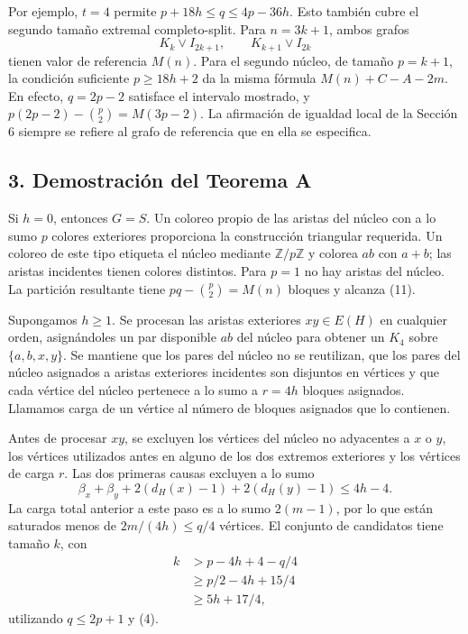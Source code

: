 \documentclass[spanish,11pt,a4paper]{article}
\begin{document}
Por ejemplo, \(t=4\) permite \(p+18h\le q\le4p-36h\). Esto también cubre
el segundo tamaño extremal completo-split. Para \(n=3k+1\), ambos grafos
\[
K_k\vee I_{2k+1},\qquad K_{k+1}\vee I_{2k}
\] tienen valor de referencia \(M(n)\). Para el segundo núcleo, de
tamaño \(p=k+1\), la condición suficiente \(p\ge18h+2\) da la misma
fórmula \(M(n)+C-A-2m\). En efecto, \(q=2p-2\) satisface el intervalo
mostrado, y \(p(2p-2)-\binom p2=M(3p-2)\). La afirmación de igualdad
local de la Sección 6 siempre se refiere al grafo de referencia que en
ella se especifica.

\subsection{3. Demostración del Teorema
A}\label{demostraciuxf3n-del-teorema-a}

Si \(h=0\), entonces \(G=S\). Un coloreo propio de las aristas del
núcleo con a lo sumo \(p\) colores exteriores proporciona la
construcción triangular requerida. Un coloreo de este tipo etiqueta el
núcleo mediante \(\mathbb Z/p\mathbb Z\) y colorea \(ab\) con \(a+b\);
las aristas incidentes tienen colores distintos. Para \(p=1\) no hay
aristas del núcleo. La partición resultante tiene \(pq-\binom p2=M(n)\)
bloques y alcanza (11).

Supongamos \(h\ge1\). Se procesan las aristas exteriores \(xy\in E(H)\)
en cualquier orden, asignándoles un par disponible \(ab\) del núcleo
para obtener un \(K_4\) sobre \(\{a,b,x,y\}\). Se mantiene que los pares
del núcleo no se reutilizan, que los pares del núcleo asignados a
aristas exteriores incidentes son disjuntos en vértices y que cada
vértice del núcleo pertenece a lo sumo a \(r=4h\) bloques asignados.
Llamamos carga de un vértice al número de bloques asignados que lo
contienen.

Antes de procesar \(xy\), se excluyen los vértices del núcleo no
adyacentes a \(x\) o \(y\), los vértices utilizados antes en alguno de
los dos extremos exteriores y los vértices de carga \(r\). Las dos
primeras causas excluyen a lo sumo \[
\beta_x+\beta_y+2(d_H(x)-1)+2(d_H(y)-1)\le4h-4. \tag{14}
\] La carga total anterior a este paso es a lo sumo \(2(m-1)\), por lo
que están saturados menos de \(2m/(4h)\le q/4\) vértices. El conjunto de
candidatos tiene tamaño \(k\), con \[
\begin{aligned}
k&>p-4h+4-q/4\\
 &\ge p/2-4h+15/4\\
 &\ge5h+17/4,
\end{aligned} \tag{15}
\] utilizando \(q\le2p+1\) y (4).
\end{document}
